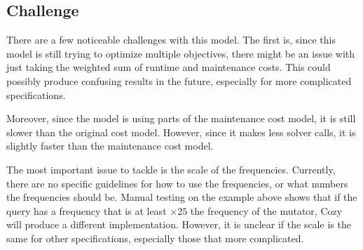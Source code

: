 \subsection{Challenge}
There are a few noticeable challenges with this model. The first is, since this
model is still trying to optimize multiple objectives, there might be an issue
with just taking the weighted sum of runtime and maintenance costs. This could
possibly produce confusing results in the future, especially for more
complicated specifications.

Moreover, since the model is using parts of the maintenance cost model, it is
still slower than the original cost model. However, since it makes less solver
calls, it is slightly faster than the maintenance cost model.

The most important issue to tackle is the scale of the frequencies. Currently,
there are no specific guidelines for how to use the frequencies, or what numbers
the frequencies should be. Manual testing on the example above shows that if the
query has a frequency that is at least $\times 25$ the frequency of the mutator,
Cozy will produce a different implementation. However, it is unclear if the
scale is the same for other specifications, especially those that more
complicated.
